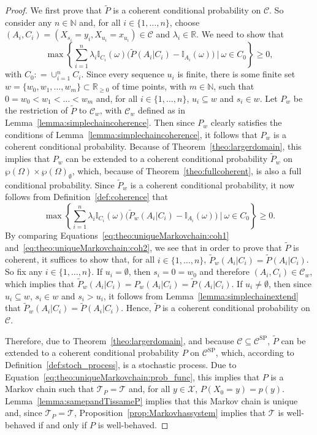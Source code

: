 \documentclass[10pt,a4paper]{paper}
\theoremstyle{definition}
\newcommand{\nats}{\mathbb{N}}
\newcommand{\reals}{\mathbb{R}}
\newcommand{\states}{\mathcal{X}}
\newcommand{\paths}{\Omega}
\newcommand{\power}{\wp(\paths)}
\newcommand{\nonemptypower}{\power_{\emptyset}}
\newcommand{\ind}[1]{\mathbb{I}_{#1}}
\newcommand{\coloneqq}{:\!=}
\begin{document}
\begin{proof}
We first prove that $\tilde{P}$ is a coherent conditional probability on $\mathcal{C}$. So consider any $n\in\nats$ and, for all $i\in\{1,\dots,n\}$, choose $(A_i,C_i)=(X_{s_i}=y_i,X_{u_i}=x_{u_i})\in\mathcal{C}$ and $\lambda_i\in\reals$. We need to show that
\begin{equation}\label{eq:theo:uniqueMarkovchain:coh1}
\max\left\{\sum_{i=1}^n\lambda_i\ind{C_i}(\omega)\bigl(\tilde{P}(A_i\vert C_i)-\ind{A_i}(\omega)\bigr)~\Bigg\vert~\omega\in C_0\right\}\geq0,
\end{equation}
with $C_0\coloneqq\cup_{i=1}^nC_i$.
Since every sequence $u_i$ is finite, there is some finite set $w=\{w_0,w_1,\dots,w_m\}\subset\reals_{\geq0}$ of time points, with $m\in\nats$, such that $0=w_0<w_1<\dots<w_m$ and, for all $i\in\{1,\dots,n\}$, $u_i\subseteq w$ and $s_i\in w$.
Let $P_w$ be the restriction of $\tilde{P}$ to $\mathcal{C}_w$, with $\mathcal{C}_w$ defined as in Lemma~\ref{lemma:simplechaincoherence}. Then since $P_w$ clearly satisfies the conditions of Lemma~\ref{lemma:simplechaincoherence}, it follows that $P_w$ is a coherent conditional probability. Because of Theorem~\ref{theo:largerdomain}, this implies that $P_w$ can be extended to a coherent conditional probability $\tilde{P}_w$ on $\power\times\nonemptypower$, which, because of Theorem~\ref{theo:fullcoherent}, is also a full conditional probability. Since $\tilde{P}_w$ is a coherent conditional probability, it now follows from Definition~\ref{def:coherence} that
\begin{equation}\label{eq:theo:uniqueMarkovchain:coh2}
\max\left\{\sum_{i=1}^n\lambda_i\ind{C_i}(\omega)\bigl(\tilde{P}_w(A_i\vert C_i)-\ind{A_i}(\omega)\bigr)~\Bigg\vert~\omega\in C_0\right\}\geq0.
\end{equation}
By comparing Equations~\eqref{eq:theo:uniqueMarkovchain:coh1} and~\eqref{eq:theo:uniqueMarkovchain:coh2}, we see that in order to prove that $\tilde{P}$ is coherent, it suffices to show that, for all $i\in\{1,\dots,n\}$, $\tilde{P}_w(A_i\vert C_i)=\tilde{P}(A_i\vert C_i)$. So fix any $i\in\{1,\dots,n\}$. If $u_i=\emptyset$, then $s_i=0=w_0$ and therefore $(A_i,C_i)\in\mathcal{C}_w$, which implies that $\tilde{P}_w(A_i\vert C_i)=P_w(A_i\vert C_i)=\tilde{P}(A_i\vert C_i)$. If $u_i\neq\emptyset$, then since $u_i\subseteq w$, $s_i\in w$ and $s_i>u_i$, it follows from Lemma~\ref{lemma:simplechainextend} that $\tilde{P}_w(A_i\vert C_i)=\tilde{P}(A_i\vert C_i)$. Hence, $\tilde{P}$ is a coherent conditional probability on $\mathcal{C}$.


Therefore, due to Theorem~\ref{theo:largerdomain}, and because $\mathcal{C}\subseteq\mathcal{C}^\mathrm{SP}$, $\tilde{P}$ can be extended to a coherent conditional probability $P$ on $\mathcal{C}^\mathrm{SP}$, which, according to Definition~\ref{def:stoch_process}, is a stochastic process. Due to Equation~\eqref{eq:theo:uniqueMarkovchain:prob_func}, this implies that $P$ is a Markov chain such that $\mathcal{T}_P=\mathcal{T}$ and, for all $y\in\states$, $P(X_0=y)=p(y)$. Lemma~\ref{lemma:samepandTissameP} implies that this Markov chain is unique and, since $\mathcal{T}_P=\mathcal{T}$, Proposition~\ref{prop:Markovhassystem} implies that $\mathcal{T}$ is well-behaved if and only if $P$ is well-behaved.
\end{proof}
\end{document}
